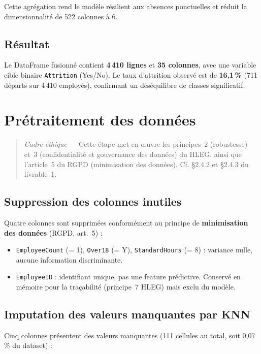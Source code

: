 \documentclass[12pt,a4paper]{article}
\begin{document}
Cette agrégation rend le modèle résilient aux absences ponctuelles et réduit la dimensionnalité de 522 colonnes à 6.

\subsection{Résultat}

Le DataFrame fusionné contient \textbf{4\,410 lignes} et \textbf{35 colonnes}, avec une variable cible binaire \texttt{Attrition} (Yes/No). Le taux d'attrition observé est de \textbf{16,1\,\%} (711 départs sur 4\,410 employés), confirmant un déséquilibre de classes significatif.

\section{Prétraitement des données}

\begin{quote}
\textit{Cadre éthique} --- Cette étape met en \oe uvre les principes~2 (robustesse) et~3 (confidentialité et gouvernance des données) du HLEG, ainsi que l'article~5 du RGPD (minimisation des données). Cf. §2.4.2 et §2.4.3 du livrable~1.
\end{quote}

\subsection{Suppression des colonnes inutiles}

Quatre colonnes sont supprimées conformément au principe de \textbf{minimisation des données} (RGPD, art.~5) :

\begin{itemize}
    \item \texttt{EmployeeCount} (= 1), \texttt{Over18} (= Y), \texttt{StandardHours} (= 8) : variance nulle, aucune information discriminante.
    \item \texttt{EmployeeID} : identifiant unique, pas une feature prédictive. Conservé en mémoire pour la traçabilité (principe~7 HLEG) mais exclu du modèle.
\end{itemize}

\subsection{Imputation des valeurs manquantes par KNN}

Cinq colonnes présentent des valeurs manquantes (111 cellules au total, soit 0,07\,\% du dataset) :
\end{document}
